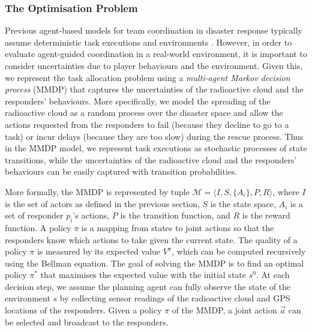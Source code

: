 \subsubsection{The Optimisation Problem}
\label{sec:model}
Previous agent-based models for team coordination in disaster
response typically assume deterministic task executions and
environments \cite{ramchurn:etal:2010,Scerri2005}. However, in
order to evaluate agent-guided coordination in a real-world
environment, it is important to consider uncertainties due to
player behaviours and the environment. Given this, we represent the
task allocation problem using a {\em multi-agent Markov decision
process} (MMDP) that captures the uncertainties of the radioactive
cloud and the responders' behaviours. More specifically, we model
the spreading of the radioactive cloud as a random process over the
disaster space and allow the actions requested from the responders
to  fail (because they decline to go to a  task) or incur delays
(because they are too slow) during the rescue process. Thus in the
MMDP model, we represent  task executions as stochastic processes
of state transitions, while the uncertainties of the radioactive
cloud and the responders' behaviours can be easily captured with
transition probabilities.

More formally, the MMDP is represented by tuple $\mathcal{M} =
\langle I, S, \{A_i\}, P, R \rangle$, where $I$ is the set of
actors as defined in the previous section,  $S$ is the state space,
$A_i$ is a set of responder $p_i$'s actions, $P$ is the transition
function, and $R$ is the reward function. A policy $\pi$ is a
mapping from states to joint actions so that the responders know
which actions to take given the current state. The quality of a
policy $\pi$ is measured by its expected value $V^\pi$, which can
be computed recursively using the Bellman equation. The goal of
solving the MMDP is to find an optimal policy $\pi^*$ that
maximises the expected value with the initial state $s^0$. At each
decision step, we assume the planning agent can fully observe the
state of the environment $s$ by collecting sensor readings of the
radioactive cloud and GPS locations of the responders. Given a
policy $\pi$ of the MMDP, a joint action $\vec{a}$ can be selected
and broadcast to the responders.

